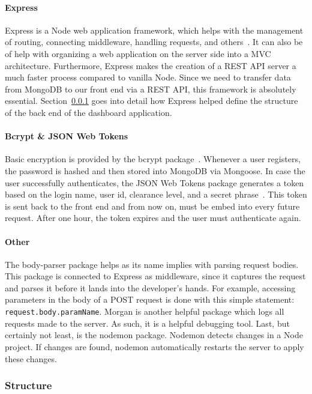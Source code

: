             \paragraph{Express} Express is a Node web application framework, which helps with the management of routing, connecting middleware, handling requests, and others~\cite{Express}. It can also be of help with organizing a web application on the server side into a MVC architecture. Furthermore, Express makes the creation of a REST API server a much faster process compared to vanilla Node. Since we need to transfer data from MongoDB to our front end via a REST API, this framework is absolutely essential. Section~\ref{backend_structure} goes into detail how Express helped define the structure of the back end of the dashboard application.

            \paragraph{Bcrypt \& JSON Web Tokens} Basic encryption is provided by the bcrypt package~\cite{Bcrypt}. Whenever a user registers, the password is hashed and then stored into MongoDB via Mongoose. In case the user successfully authenticates, the JSON Web Tokens package generates a token based on the login name, user id, clearance level, and a secret phrase~\cite{JWT}. This token is sent back to the front end and from now on, must be embed into every future request. After one hour, the token expires and the user must authenticate again.

            \paragraph{Other} The body-parser package helps as its name implies with parsing request bodies. This package is connected to Express as middleware, since it captures the request and parses it before it lands into the developer's hands. For example, accessing parameters in the body of a POST request is done with this simple statement: \texttt{request.body.paramName}. Morgan is another helpful package which logs all requests made to the server. As such, it is a helpful debugging tool. Last, but certainly not least, is the nodemon package. Nodemon detects changes in a Node project. If changes are found, nodemon automatically restarts the server to apply these changes.


        \subsubsection{Structure}\label{backend_structure}
        
